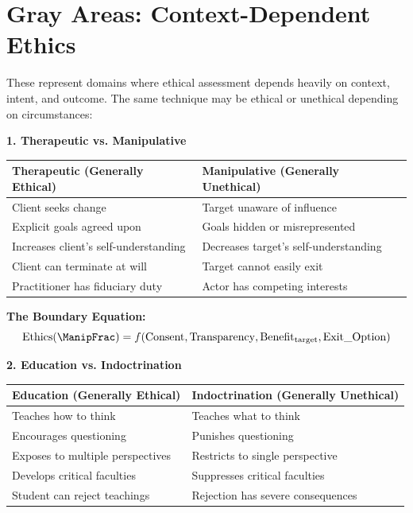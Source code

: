 \documentclass[11pt,twoside]{book}
\begin{document}
\section{Gray Areas: Context-Dependent Ethics}

\begin{tcolorbox}[colback=gray!20!white,colframe=gray!60!black,title=\textbf{Category II: Gray Areas},breakable]

These represent domains where ethical assessment depends heavily on context,
intent, and outcome. The same technique may be ethical or unethical depending
on circumstances:

\bigskip
\textbf{1. Therapeutic vs. Manipulative}

\begin{center}
\begin{tabular}{p{6cm}|p{6cm}}
\textbf{Therapeutic (Generally Ethical)} & \textbf{Manipulative (Generally Unethical)} \\
\hline
Client seeks change & Target unaware of influence \\
Explicit goals agreed upon & Goals hidden or misrepresented \\
Increases client's self-understanding & Decreases target's self-understanding \\
Client can terminate at will & Target cannot easily exit \\
Practitioner has fiduciary duty & Actor has competing interests \\
\end{tabular}
\end{center}

\textbf{The Boundary Equation:}
\begin{equation}
    \mathrm{Ethics}(\ManipFrac) = f(\mathrm{Consent}, \mathrm{Transparency},
    \mathrm{Benefit}_{\mathrm{target}}, \mathrm{Exit\_Option})
\end{equation}

\bigskip
\textbf{2. Education vs. Indoctrination}

\begin{center}
\begin{tabular}{p{6cm}|p{6cm}}
\textbf{Education (Generally Ethical)} & \textbf{Indoctrination (Generally Unethical)} \\
\hline
Teaches how to think & Teaches what to think \\
Encourages questioning & Punishes questioning \\
Exposes to multiple perspectives & Restricts to single perspective \\
Develops critical faculties & Suppresses critical faculties \\
Student can reject teachings & Rejection has severe consequences \\
\end{tabular}
\end{center}


\end{tcolorbox}
\end{document}
